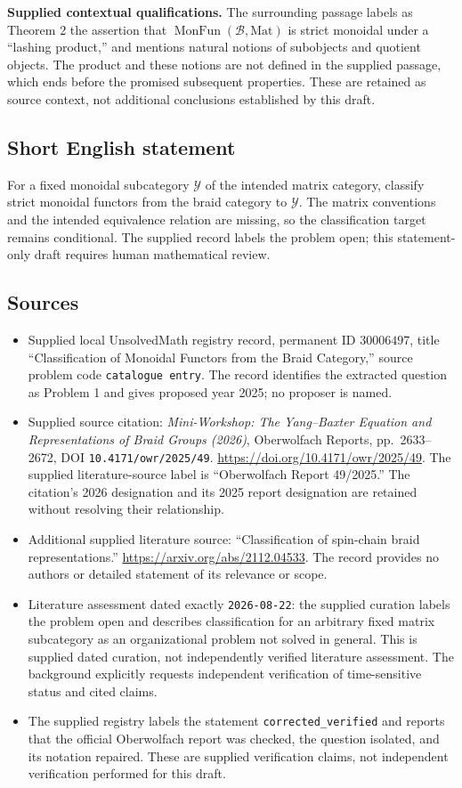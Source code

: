 \documentclass[11pt]{article}
\begin{document}
\textbf{Supplied contextual qualifications.} The surrounding passage labels as Theorem 2 the assertion that \(\operatorname{MonFun}(\mathcal B,\mathrm{Mat})\) is strict monoidal under a ``lashing product,'' and mentions natural notions of subobjects and quotient objects. The product and these notions are not defined in the supplied passage, which ends before the promised subsequent properties. These are retained as source context, not additional conclusions established by this draft.
\subsection{Short English statement}
For a fixed monoidal subcategory \(\mathcal Y\) of the intended matrix category, classify strict monoidal functors from the braid category to \(\mathcal Y\). The matrix conventions and the intended equivalence relation are missing, so the classification target remains conditional. The supplied record labels the problem open; this statement-only draft requires human mathematical review.
\subsection{Sources}
\begin{itemize}
\item Supplied local UnsolvedMath registry record, permanent ID \(30006497\), title ``Classification of Monoidal Functors from the Braid Category,'' source problem code \texttt{catalogue entry}. The record identifies the extracted question as Problem 1 and gives proposed year 2025; no proposer is named.
\item Supplied source citation: \emph{Mini-Workshop: The Yang--Baxter Equation and Representations of Braid Groups (2026)}, Oberwolfach Reports, pp.~2633--2672, DOI \texttt{10.4171/owr/2025/49}. \url{https://doi.org/10.4171/owr/2025/49}. The supplied literature-source label is ``Oberwolfach Report 49/2025.'' The citation's 2026 designation and its 2025 report designation are retained without resolving their relationship.
\item Additional supplied literature source: ``Classification of spin-chain braid representations.'' \url{https://arxiv.org/abs/2112.04533}. The record provides no authors or detailed statement of its relevance or scope.
\item Literature assessment dated exactly \texttt{2026-08-22}: the supplied curation labels the problem open and describes classification for an arbitrary fixed matrix subcategory as an organizational problem not solved in general. This is supplied dated curation, not independently verified literature assessment. The background explicitly requests independent verification of time-sensitive status and cited claims.
\item The supplied registry labels the statement \texttt{corrected\_verified} and reports that the official Oberwolfach report was checked, the question isolated, and its notation repaired. These are supplied verification claims, not independent verification performed for this draft.
\end{itemize}
\end{document}
